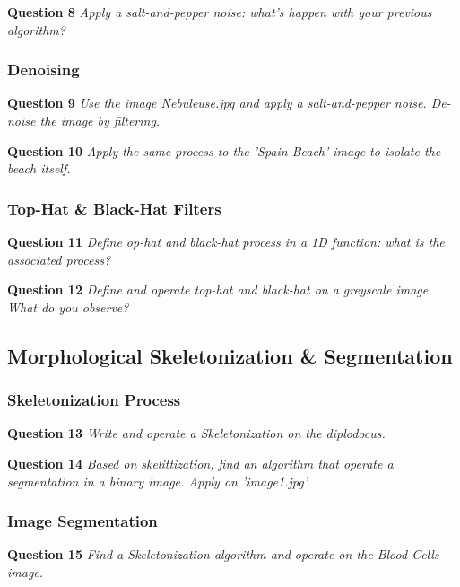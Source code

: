 \textbf{Question 8} \textit{Apply a salt-and-pepper noise: what’s happen with your previous algorithm?}


\subsubsection{Denoising}
\textbf{Question 9} \textit{Use the image Nebuleuse.jpg and apply a salt-and-pepper noise. De-noise the image by ﬁltering.}

\textbf{Question 10} \textit{Apply the same process to the ’Spain Beach’ image to isolate the beach itself.}

\subsubsection{Top-Hat \& Black-Hat Filters}
\textbf{Question 11} \textit{Deﬁne op-hat and black-hat process in a 1D function: what is the associated process?}

\textbf{Question 12} \textit{Deﬁne and operate top-hat and black-hat on a greyscale image. What do you observe?}


\subsection{Morphological Skeletonization \& Segmentation}
\subsubsection{Skeletonization Process}
\textbf{Question 13} \textit{Write and operate a Skeletonization on the diplodocus.}


\textbf{Question 14} \textit{Based on skelittization, ﬁnd an algorithm that operate a segmentation in a binary image. Apply on ’image1.jpg’.}


\subsubsection{Image Segmentation}
\textbf{Question 15} \textit{Find a Skeletonization algorithm and operate on the Blood Cells image.}


